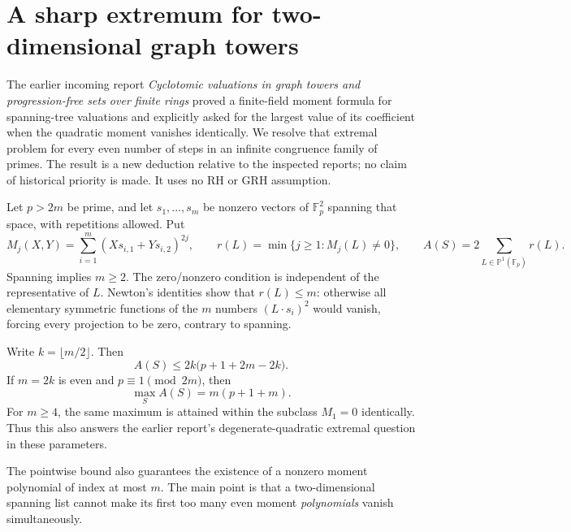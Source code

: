 \section{A sharp extremum for two-dimensional graph towers}
\label{sec:moment-extremum}

The earlier incoming report
\emph{Cyclotomic valuations in graph towers and progression-free sets over finite rings}
proved a finite-field moment formula for spanning-tree valuations and explicitly
asked for the largest value of its coefficient when the quadratic moment
vanishes identically.\cite{priorGraph} We resolve that extremal problem for every even number
of steps in an infinite congruence family of primes. The result is a new
deduction relative to the inspected reports; no claim of historical priority
is made. It uses no RH or GRH assumption.

Let $p>2m$ be prime, and let $s_1,\dots,s_m$ be nonzero vectors of
$\mathbb F_p^2$ spanning that space, with repetitions allowed. Put
\[
 M_j(X,Y)=\sum_{i=1}^m(Xs_{i,1}+Ys_{i,2})^{2j},\qquad
 r(L)=\min\{j\ge1:M_j(L)\ne0\},\qquad
 A(S)=2\sum_{L\in\mathbb P^1(\mathbb F_p)}r(L).
\]
Spanning implies $m\ge2$. The zero/nonzero condition is independent of the representative of $L$.
Newton's identities show that $r(L)\le m$: otherwise all elementary
symmetric functions of the $m$ numbers $(L\cdot s_i)^2$ would vanish,
forcing every projection to be zero, contrary to spanning.

\begin{theorem}
\label{thm:moment-maximum}
Write $k=\lfloor m/2\rfloor$. Then
\[
                 A(S)\le 2k\bigl(p+1+2m-2k\bigr).
\]
If $m=2k$ is even and $p\equiv1\pmod{2m}$, then
\[
             \boxed{\ \max_S A(S)=m(p+1+m).\ }
\]
For $m\ge4$, the same maximum is attained within the subclass $M_1=0$
identically. Thus this also answers the earlier report's degenerate-quadratic
extremal question in these parameters.
\end{theorem}

The pointwise bound also guarantees the existence of a nonzero moment polynomial of index at most $m$. The main point is that a two-dimensional spanning list cannot make its first
too many even moment \emph{polynomials} vanish simultaneously.

